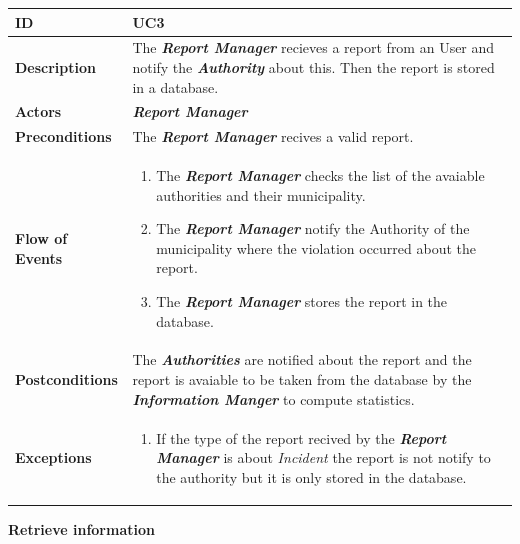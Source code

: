 \documentclass{report}
\begin{document}
\begin{tabularx}{\linewidth}{| l | X |}
	\hline
	\textbf{ID} & UC3\\
	
	\hline
	\textbf{Description} & The \textbf{\textit{Report Manager}} recieves a report from an User and notify the \textbf{\textit{Authority}} about this. Then the report is stored in a database.\\
	
	\hline
	\textbf{Actors} & \textbf{\textit{Report Manager}}\\
	
	\hline
	\textbf{Preconditions} & The \textbf{\textit{Report Manager}} recives a valid report.\\
	
	\hline
	\textbf{Flow of Events} & \parbox{0.7\textwidth}{\begin{enumerate}
			\item The \textbf{\textit{Report Manager}} checks the list of the avaiable authorities and their municipality.			
			\item The \textbf{\textit{Report Manager}} notify the Authority of the municipality where the violation occurred about the report.
			
			\item The \textbf{\textit{Report Manager}} stores the report in the database.
					
			
	\end{enumerate}}\\
	
	\hline
	\textbf{Postconditions} & The \textbf{\textit{Authorities}} are notified about the report and the report is avaiable to be taken from the database by the \textbf{\textit{Information Manger}} to compute statistics.\\
	
	\hline
	\textbf{Exceptions} & \parbox{0.7\textwidth}{ \begin{enumerate}
			\item If the type of the report recived by the \textbf{\textit{Report Manager}} is about \textit{Incident} the report is not notify to the authority but it is only stored in the database. 
		\end{enumerate}}\\
	
	\hline
	
\end{tabularx}
\begin{center}
	\textbf{Retrieve information}
\end{center}
\end{document}
